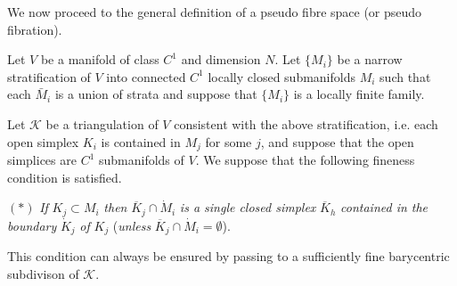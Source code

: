 We now proceed to the general definition of a pseudo fibre space (or
pseudo fibration). 

Let $V$ be a manifold of class $C^1$ and dimension $N$. Let $\{ M_i \}$
be a narrow stratification of $V$ into connected $C^1$ locally closed
submanifolds $M_{i}$ such that each $\bar{M}_{i}$ is a union of strata
and suppose that $\{M_{i}\}$ is a locally finite family.

Let $\mathscr{K}$ be a triangulation of $V$ consistent with the above
stratification, i.e. each open simplex $K_i$ is contained in  $M_j$
for some $j$, and suppose that the open simplices  are $C^1$
submanifolds of $V$. We suppose that the following fineness condition
is satisfied. 

$(\ast)$ \textit{If} $K_j \subset M_i$ \textit{then} $\overline{K}_j
\cap \dot{M} _{i}$ \textit{is a single closed simplex}
$\overline{K}_h$ \textit{contained in the boundary}
$\dot{K}_j$ \textit{of} $K_j$ (\textit{unless}
$\overline{K}_j \cap \dot{M}_i = \emptyset$).  

This condition can always be ensured by passing to a sufficiently fine
barycentric subdivison of $\mathscr{K}$. 

